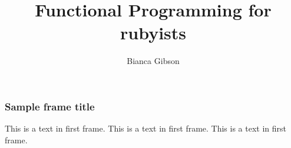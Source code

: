 \documentclass{beamer}
\title{Functional Programming for rubyists}
\author{Bianca Gibson}
\institute{Ruby Conf AU 2016}
\begin{document}
\frame{\titlepage}

\begin{frame}
\frametitle{Sample frame title}
This is a text in first frame. This is a text in first frame. This is a text in first frame.
\end{frame}
\end{document}

